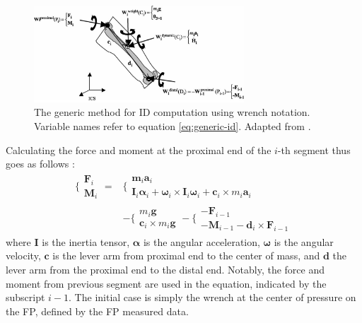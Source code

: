 \documentclass[../main.tex]{subfiles}
\begin{document}
\begin{figure}[!htb]
    \centering
    \includegraphics[width=0.7\textwidth]{img/Generic_ID_original.PNG}
    \caption{The generic method for \ac{ID} computation using wrench notation. Variable names refer to equation \ref{eq:generic-id}. Adapted from \cite{Dumas2004}.}
    \label{fig:generic-ID-forces-and-segments}
\end{figure}
Calculating the force and moment at the proximal end of the $i$-th segment thus goes as follows \cite{Dumas2004}:
\begin{align}
\label{eq:generic-id}
    \biggl\{
            \begin{array}{ll}
              \mathbf{F}_i\\
              \mathbf{M}_i
            \end{array} =&
        \biggl\{
            \begin{array}{cc}
                \mathbf{m}_i\bm{a}_i\\
                \mathbf{I}_i\bm{\alpha}_i + \bm{\omega}_i \times \mathbf{I}_i\bm{\omega}_i + \mathbf{c}_i \times m_i\mathbf{a}_i
            \end{array}
         \nonumber\\
    &- 
    \biggl\{
            \begin{array}{cc}
                m_i\mathbf{g}\\
                \mathbf{c}_i \times m_i\mathbf{g}
            \end{array} -
        \biggl\{
            \begin{array}{cc}
                -\mathbf{F}_{i-1}\\
                -\mathbf{M}_{i-1}-\mathbf{d}_i \times \mathbf{F}_{i-1}
            \end{array}
\end{align}
where $\mathbf{I}$ is the inertia tensor, $\bm{\alpha}$ is the angular acceleration, $\bm{\omega}$ is the angular velocity, $\mathbf{c}$ is the lever arm from proximal end to the center of mass, and $\mathbf{d}$ the lever arm from the proximal end to the distal end.
Notably, the force and moment from previous segment are used in the equation, indicated by the subscript $i-1$.
The initial case is simply the wrench at the center of pressure on the \ac{FP}, defined by the \ac{FP} measured data.
\end{document}

